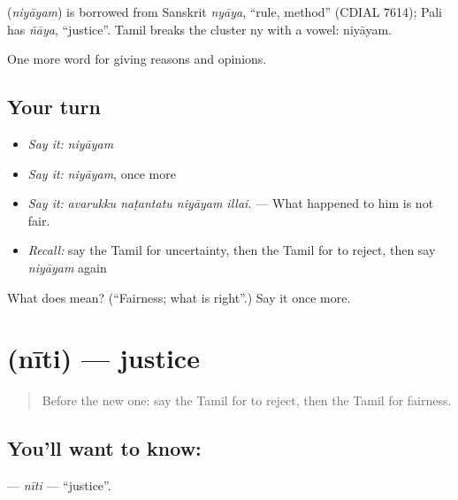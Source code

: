 \begin{cousinweb}
\textbf{} (\emph{niyāyam}) is borrowed from Sanskrit \emph{nyāya}, \textquotedblleft{}rule, method\textquotedblright{} (CDIAL 7614); Pali has \emph{ñāya}, \textquotedblleft{}justice\textquotedblright{}. Tamil breaks the cluster ny with a vowel: niyāyam.
\end{cousinweb}

\begin{grammarlens}[title={What you've built}]
One more word for giving reasons and opinions.
\end{grammarlens}

\subsection*{Your turn}
\begin{itemize}
\raggedright
  \item \emph{Say it:} \emph{niyāyam}
  \item \emph{Say it:} \emph{niyāyam}, once more
  \item \emph{Say it:} \emph{avarukku naṭantatu niyāyam illai.} — What happened to him is not fair.
  \item \emph{Recall:} say the Tamil for uncertainty, then the Tamil for to reject, then say \emph{niyāyam} again
\end{itemize}

\begin{tcolorbox}[breakable,colback=teal!4,colframe=teal!35!black,title={Before you move on}]
What does  mean? (\textquotedblleft{}Fairness; what is right\textquotedblright{}.) Say it once more.
\end{tcolorbox}
\section[\texorpdfstring{\ta{நீதி} (nīti)}{நீதி (nīti)}]{ (nīti) — justice}

\label{lesson:TA-C360-niti}



\begin{quote}
Before the new one: say the Tamil for to reject, then the Tamil for fairness.
\end{quote}

\subsection*{You'll want to know: }
\textbf{} — \emph{nīti} — \textquotedblleft{}justice\textquotedblright{}.


